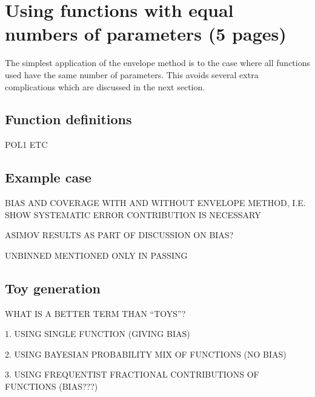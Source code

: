 \section{Using functions with equal numbers of parameters (5 pages)}
\label{sec:functions}

The simplest application of the envelope method is to the case where all
functions used have the same number of parameters. This avoids several extra
complications which are discussed in the next section.

\subsection{Function definitions}
\label{sec:functions:function}

POL1 ETC

\subsection{Example case}
\label{sec:functions:example}

BIAS AND COVERAGE WITH AND WITHOUT ENVELOPE METHOD, I.E. SHOW SYSTEMATIC
ERROR CONTRIBUTION IS NECESSARY

ASIMOV RESULTS AS PART OF DISCUSSION ON BIAS?

UNBINNED MENTIONED ONLY IN PASSING


\subsection{Toy generation}
\label{sec:functions:toys}

WHAT IS A BETTER TERM THAN ``TOYS''?

1. USING SINGLE FUNCTION (GIVING BIAS)

2. USING BAYESIAN PROBABILITY MIX OF FUNCTIONS (NO BIAS)

3. USING FREQUENTIST FRACTIONAL CONTRIBUTIONS OF FUNCTIONS (BIAS???)
